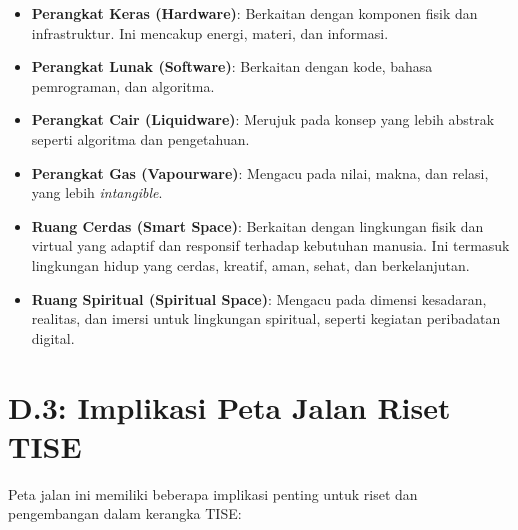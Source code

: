 \documentclass[
  letterpaper,
  DIV=11,
  numbers=noendperiod]{scrreprt}
\providecommand{\tightlist}{%
  \setlength{\itemsep}{0pt}\setlength{\parskip}{0pt}}
\begin{document}
\begin{itemize}
\tightlist
\item
  \textbf{Perangkat Keras (Hardware)}: Berkaitan dengan komponen fisik
  dan infrastruktur. Ini mencakup energi, materi, dan informasi.
\item
  \textbf{Perangkat Lunak (Software)}: Berkaitan dengan kode, bahasa
  pemrograman, dan algoritma.
\item
  \textbf{Perangkat Cair (Liquidware)}: Merujuk pada konsep yang lebih
  abstrak seperti algoritma dan pengetahuan.
\item
  \textbf{Perangkat Gas (Vapourware)}: Mengacu pada nilai, makna, dan
  relasi, yang lebih \emph{intangible}.
\item
  \textbf{Ruang Cerdas (Smart Space)}: Berkaitan dengan lingkungan fisik
  dan virtual yang adaptif dan responsif terhadap kebutuhan manusia. Ini
  termasuk lingkungan hidup yang cerdas, kreatif, aman, sehat, dan
  berkelanjutan.
\item
  \textbf{Ruang Spiritual (Spiritual Space)}: Mengacu pada dimensi
  kesadaran, realitas, dan imersi untuk lingkungan spiritual, seperti
  kegiatan peribadatan digital.
\end{itemize}

\section{\texorpdfstring{\textbf{D.3: Implikasi Peta Jalan Riset
TISE}}{D.3: Implikasi Peta Jalan Riset TISE}}\label{d.3-implikasi-peta-jalan-riset-tise-1}

Peta jalan ini memiliki beberapa implikasi penting untuk riset dan
pengembangan dalam kerangka TISE:
\end{document}
